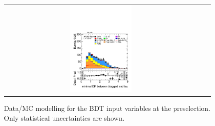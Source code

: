 \begin{figure}[htbp]
\begin{tabular}{@{}c c c@{}}
      \includegraphics[width=0.33\textwidth]{images/modelling_tmva_vars/plot_minDRbtau_hh_tth.pdf}
    \end{tabular}
  
    \caption{Data/MC modelling for the \ttH BDT input variables at the \ttHtt preselection. Only statistical uncertainties are shown.}
    \label{tth_vars_modelling_1}
\end{figure}

